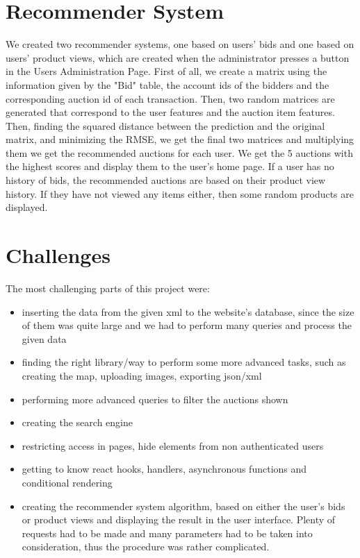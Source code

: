\documentclass{article}
\begin{document}
\section{Recommender System}
We created two recommender systems, one based on users' bids and one based on users' product views, which are created when the administrator presses a button in the Users Administration Page. First of all, we create a matrix using the information given by the "Bid" table, the account ids of the bidders and the corresponding auction id of each transaction. Then, two random matrices are generated that correspond to the user features and the auction item features. Then, finding the squared distance between the prediction and the original matrix, and minimizing the RMSE, we get the final two matrices and multiplying them we get the recommended auctions for each user. We get the 5 auctions with the highest scores and display them to the user's home page. If a user has no history of bids, the recommended auctions are based on their product view history. If they have not viewed any items either, then some random products are displayed.


\section{Challenges}
The most challenging parts of this project were:
\begin{itemize}
\item inserting the data from the given xml to the website's database, since the size of them was quite large and we had to perform many queries and process the given data
\item finding the right library/way to perform some more advanced tasks, such as creating the map, uploading images, exporting json/xml
\item performing more advanced queries to filter the auctions shown
\item creating the search engine
\item restricting access in pages, hide elements from non authenticated users
\item getting to know react hooks, handlers, asynchronous functions and conditional rendering
\item creating the recommender system algorithm, based on either the user's bids or product views and displaying the result in the user interface. Plenty of requests had to be made and many parameters had to be taken into consideration, thus the procedure was rather complicated.
\end{itemize}
\end{document}

